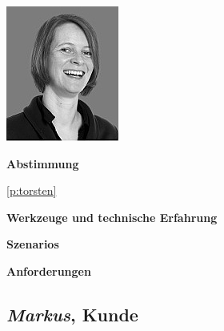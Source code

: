 \begin{multicols}{2}

\begin{center}
\includegraphics[width=0.5\columnwidth]{media/jorinde.jpg}
\end{center}


\textbf{Abstimmung}

\ref{p:torsten}

\textbf{Werkzeuge und technische Erfahrung}

\columnbreak

\textbf{Szenarios}

\textbf{Anforderungen}

\end{multicols}

\pagebreak

\subsection{\emph{Markus}, Kunde}\label{p:markus}


